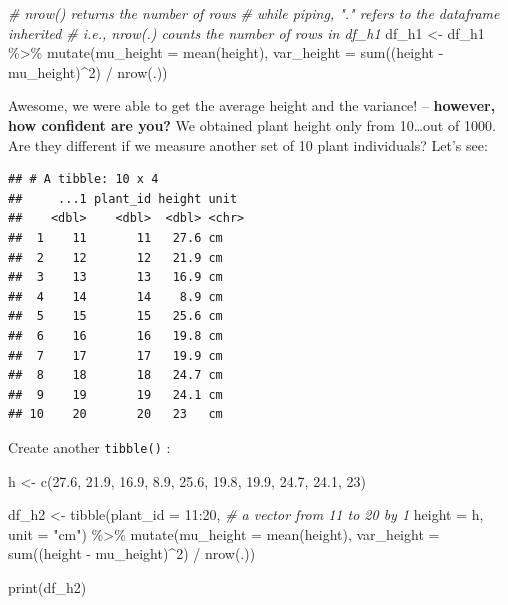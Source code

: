 \documentclass[
]{book}
\newenvironment{Shaded}{\begin{snugshade}}{\end{snugshade}}
\newcommand{\AttributeTok}[1]{\textcolor[rgb]{0.77,0.63,0.00}{#1}}
\newcommand{\CommentTok}[1]{\textcolor[rgb]{0.56,0.35,0.01}{\textit{#1}}}
\newcommand{\DecValTok}[1]{\textcolor[rgb]{0.00,0.00,0.81}{#1}}
\newcommand{\FloatTok}[1]{\textcolor[rgb]{0.00,0.00,0.81}{#1}}
\newcommand{\FunctionTok}[1]{\textcolor[rgb]{0.00,0.00,0.00}{#1}}
\newcommand{\NormalTok}[1]{#1}
\newcommand{\OtherTok}[1]{\textcolor[rgb]{0.56,0.35,0.01}{#1}}
\newcommand{\SpecialCharTok}[1]{\textcolor[rgb]{0.00,0.00,0.00}{#1}}
\newcommand{\StringTok}[1]{\textcolor[rgb]{0.31,0.60,0.02}{#1}}
\begin{document}
\begin{Shaded}
\begin{Highlighting}[]
\CommentTok{\# nrow() returns the number of rows}
\CommentTok{\# while piping, "." refers to the dataframe inherited }
\CommentTok{\# i.e., nrow(.) counts the number of rows in df\_h1}
\NormalTok{df\_h1 }\OtherTok{\textless{}{-}}\NormalTok{ df\_h1 }\SpecialCharTok{\%\textgreater{}\%} 
  \FunctionTok{mutate}\NormalTok{(}\AttributeTok{mu\_height =} \FunctionTok{mean}\NormalTok{(height),}
         \AttributeTok{var\_height =} \FunctionTok{sum}\NormalTok{((height }\SpecialCharTok{{-}}\NormalTok{ mu\_height)}\SpecialCharTok{\^{}}\DecValTok{2}\NormalTok{) }\SpecialCharTok{/} \FunctionTok{nrow}\NormalTok{(.))}
\end{Highlighting}
\end{Shaded}

Awesome, we were able to get the average height and the variance! -- \textbf{however, how confident are you?} We obtained plant height only from 10\ldots out of 1000. Are they different if we measure another set of 10 plant individuals? Let's see:

\begin{verbatim}
## # A tibble: 10 x 4
##     ...1 plant_id height unit 
##    <dbl>    <dbl>  <dbl> <chr>
##  1    11       11   27.6 cm   
##  2    12       12   21.9 cm   
##  3    13       13   16.9 cm   
##  4    14       14    8.9 cm   
##  5    15       15   25.6 cm   
##  6    16       16   19.8 cm   
##  7    17       17   19.9 cm   
##  8    18       18   24.7 cm   
##  9    19       19   24.1 cm   
## 10    20       20   23   cm
\end{verbatim}

Create another \texttt{tibble()} :

\begin{Shaded}
\begin{Highlighting}[]
\NormalTok{h }\OtherTok{\textless{}{-}} \FunctionTok{c}\NormalTok{(}\FloatTok{27.6}\NormalTok{, }\FloatTok{21.9}\NormalTok{, }\FloatTok{16.9}\NormalTok{, }\FloatTok{8.9}\NormalTok{, }\FloatTok{25.6}\NormalTok{, }\FloatTok{19.8}\NormalTok{, }\FloatTok{19.9}\NormalTok{, }\FloatTok{24.7}\NormalTok{, }\FloatTok{24.1}\NormalTok{, }\DecValTok{23}\NormalTok{)}

\NormalTok{df\_h2 }\OtherTok{\textless{}{-}} \FunctionTok{tibble}\NormalTok{(}\AttributeTok{plant\_id =} \DecValTok{11}\SpecialCharTok{:}\DecValTok{20}\NormalTok{, }\CommentTok{\# a vector from 11 to 20 by 1}
                \AttributeTok{height =}\NormalTok{ h,}
                \AttributeTok{unit =} \StringTok{"cm"}\NormalTok{) }\SpecialCharTok{\%\textgreater{}\%} 
  \FunctionTok{mutate}\NormalTok{(}\AttributeTok{mu\_height =} \FunctionTok{mean}\NormalTok{(height),}
         \AttributeTok{var\_height =} \FunctionTok{sum}\NormalTok{((height }\SpecialCharTok{{-}}\NormalTok{ mu\_height)}\SpecialCharTok{\^{}}\DecValTok{2}\NormalTok{) }\SpecialCharTok{/} \FunctionTok{nrow}\NormalTok{(.))}

\FunctionTok{print}\NormalTok{(df\_h2)}
\end{Highlighting}
\end{Shaded}
\end{document}
